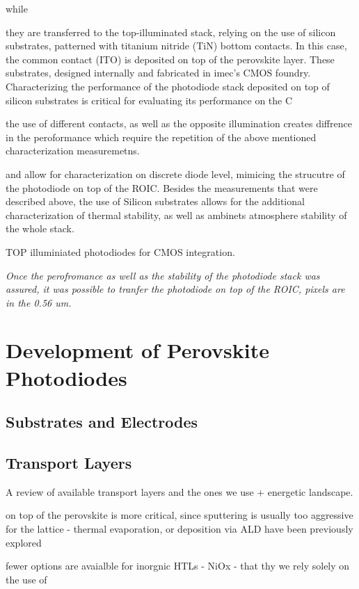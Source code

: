 while 


they are transferred to the top-illuminated stack, relying on the use of silicon substrates, patterned with titanium nitride (TiN) bottom contacts. In this case, the common contact (ITO) is deposited on top of the perovskite layer. These substrates, designed internally and fabricated in imec's CMOS foundry. Characterizing the performance of the photodiode stack deposited on top of silicon substrates is critical for evaluating its performance on the C

the use of different contacts, as well as the opposite illumination creates diffrence in the peroformance which require the repetition of the above mentioned characterization measuremetns. 


and allow for characterization on discrete diode level, mimicing the strucutre of the photodiode on top of the ROIC. Besides the measurements that were described above, the use of Silicon substrates allows for the additional characterization of thermal stability, as well as ambinets atmosphere stability of the whole stack. 


TOP illuminiated photodiodes for CMOS integration. 

\textit{Once the perofromance as well as the stability of the photodiode stack was assured, it was possible to tranfer the photodiode on top of the ROIC, pixels are in the 0.56 um. 
}



\section{Development of Perovskite Photodiodes}

\subsection{Substrates and Electrodes}

\subsection{Transport Layers}

A review of available transport layers and the ones we use + energetic landscape.

on top of the perovskite is more critical, since sputtering is usually too aggressive for the lattice - thermal evaporation, or deposition via ALD have been previously explored 

fewer options are avaialble for inorgnic HTLs - NiOx - that thy we rely solely on the use of 


